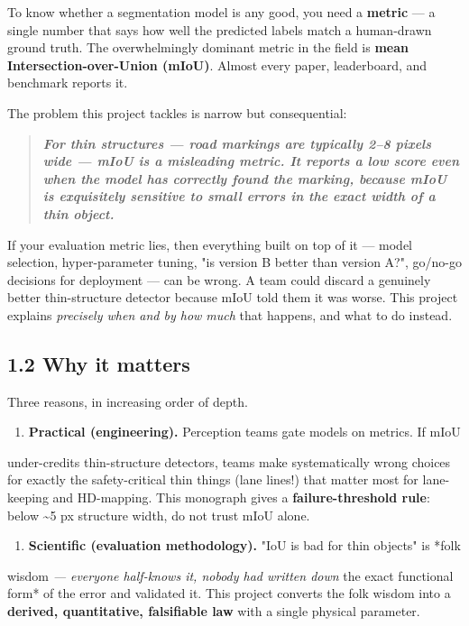 \documentclass[11pt]{article}
\begin{document}
To know whether a segmentation model is any good, you need a \textbf{metric} --- a single number that says how well the predicted labels match a human-drawn ground truth. The overwhelmingly dominant metric in the field is \textbf{mean Intersection-over-Union (mIoU)}. Almost every paper, leaderboard, and benchmark reports it.

The problem this project tackles is narrow but consequential:

\begin{quote}\itshape \textbf{For thin structures --- road markings are typically 2--8 pixels wide --- mIoU is a misleading metric. It reports a low score even when the model has correctly found the marking, because mIoU is exquisitely sensitive to small errors in the exact \textit{width} of a thin object.}\end{quote}

If your evaluation metric lies, then everything built on top of it --- model selection, hyper-parameter tuning, "is version B better than version A?", go/no-go decisions for deployment --- can be wrong. A team could discard a genuinely better thin-structure detector because mIoU told them it was worse. This project explains \textit{precisely when and by how much} that happens, and what to do instead.

\subsection*{1.2 Why it matters}

Three reasons, in increasing order of depth.

\begin{enumerate}\setlength{\itemsep}{1pt}
\item \textbf{Practical (engineering).} Perception teams gate models on metrics. If mIoU
\end{enumerate}
   under-credits thin-structure detectors, teams make systematically wrong choices    for exactly the safety-critical thin things (lane lines!) that matter most for    lane-keeping and HD-mapping. This monograph gives a \textbf{failure-threshold rule}:    below \textasciitilde{}5 px structure width, do not trust mIoU alone.

\begin{enumerate}\setlength{\itemsep}{1pt}
\item \textbf{Scientific (evaluation methodology).} "IoU is bad for thin objects" is *folk
\end{enumerate}
   wisdom\textit{ --- everyone half-knows it, nobody had written down }the exact functional    form* of the error and validated it. This project converts the folk wisdom into a    \textbf{derived, quantitative, falsifiable law} with a single physical parameter.
\end{document}
